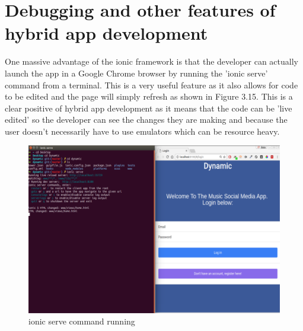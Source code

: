 \section{Debugging and other features of hybrid app development}
One massive advantage of the ionic framework is that the developer can actually launch the app in a Google Chrome browser by running the 'ionic serve' command from a terminal. This is a very useful feature as it also allows for code to be edited and the page will simply refresh as shown in Figure 3.15. This is a clear positive of hybrid app development as it means that the code can be 'live edited' so the developer can see the changes they are making and because the user doesn't necessarily have to use emulators which can be resource heavy.
\begin{center}
\begin{figure}[H]
\includegraphics[scale=0.45]{images/chrome}
\caption{ionic serve command running}
\end{figure}
\end{center}

